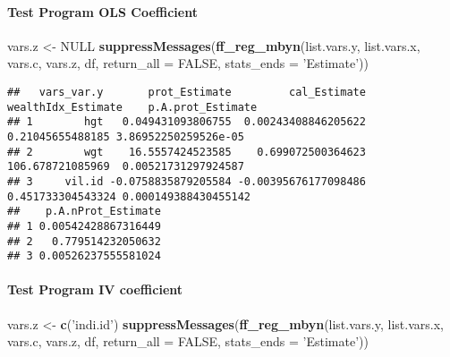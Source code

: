 \documentclass[
]{book}
\newenvironment{Shaded}{\begin{snugshade}}{\end{snugshade}}
\newcommand{\DataTypeTok}[1]{\textcolor[rgb]{0.13,0.29,0.53}{#1}}
\newcommand{\KeywordTok}[1]{\textcolor[rgb]{0.13,0.29,0.53}{\textbf{#1}}}
\newcommand{\NormalTok}[1]{#1}
\newcommand{\OtherTok}[1]{\textcolor[rgb]{0.56,0.35,0.01}{#1}}
\newcommand{\StringTok}[1]{\textcolor[rgb]{0.31,0.60,0.02}{#1}}
\begin{document}
\hypertarget{test-program-ols-coefficient}{%
\paragraph{Test Program OLS Coefficient}\label{test-program-ols-coefficient}}

\begin{Shaded}
\begin{Highlighting}[]
\NormalTok{vars.z <-}\StringTok{ }\OtherTok{NULL}
\KeywordTok{suppressMessages}\NormalTok{(}\KeywordTok{ff_reg_mbyn}\NormalTok{(list.vars.y, list.vars.x,}
\NormalTok{                             vars.c, vars.z, df,}
                             \DataTypeTok{return_all =} \OtherTok{FALSE}\NormalTok{,}
                             \DataTypeTok{stats_ends =} \StringTok{'Estimate'}\NormalTok{))}
\end{Highlighting}
\end{Shaded}

\begin{verbatim}
##   vars_var.y       prot_Estimate         cal_Estimate wealthIdx_Estimate    p.A.prot_Estimate
## 1        hgt   0.049431093806755  0.00243408846205622   0.21045655488185 3.86952250259526e-05
## 2        wgt    16.5557424523585    0.699072500364623   106.678721085969  0.00521731297924587
## 3     vil.id -0.0758835879205584 -0.00395676177098486  0.451733304543324 0.000149388430455142
##    p.A.nProt_Estimate
## 1 0.00542428867316449
## 2   0.779514232050632
## 3 0.00526237555581024
\end{verbatim}

\hypertarget{test-program-iv-coefficient}{%
\paragraph{Test Program IV coefficient}\label{test-program-iv-coefficient}}

\begin{Shaded}
\begin{Highlighting}[]
\NormalTok{vars.z <-}\StringTok{ }\KeywordTok{c}\NormalTok{(}\StringTok{'indi.id'}\NormalTok{)}
\KeywordTok{suppressMessages}\NormalTok{(}\KeywordTok{ff_reg_mbyn}\NormalTok{(list.vars.y, list.vars.x,}
\NormalTok{                             vars.c, vars.z, df,}
                             \DataTypeTok{return_all =} \OtherTok{FALSE}\NormalTok{,}
                             \DataTypeTok{stats_ends =} \StringTok{'Estimate'}\NormalTok{))}
\end{Highlighting}
\end{Shaded}
\end{document}
